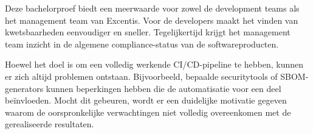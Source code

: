 Deze bachelorproef biedt een meerwaarde voor zowel de development teams als het management team van Excentis. Voor de developers maakt het vinden van kwetsbaarheden eenvoudiger en sneller. Tegelijkertijd krijgt het management team inzicht in de algemene compliance-status van de softwareproducten.

Hoewel het doel is om een volledig werkende CI/CD-pipeline te hebben, kunnen er zich altijd problemen ontstaan. Bijvoorbeeld, bepaalde securitytools of SBOM-generators kunnen beperkingen hebben die de automatisatie voor een deel beïnvloeden. Mocht dit gebeuren, wordt er een duidelijke motivatie gegeven waarom de oorspronkelijke verwachtingen niet volledig overeenkomen met de gerealiseerde resultaten.

